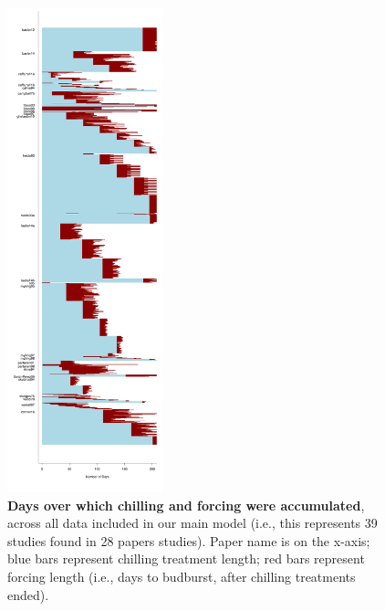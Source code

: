 \documentclass{article}
\begin{document}
\begin{figure}[h!]
\centering
\noindent \includegraphics[width=0.40\textwidth]{..//..//analyses/bb_analysis/figures/chilldaysforcedays2.pdf}
\caption{\textbf{Days over which chilling and forcing were accumulated}, across all data included in our main model (i.e., this represents 39 studies found in 28 papers studies). Paper name is on the x-axis; blue bars represent chilling treatment length; red bars represent forcing length (i.e., days to budburst, after chilling treatments ended).}
\label{fig:chillforceplot}
\end{figure}
 \newpage
\end{document}
